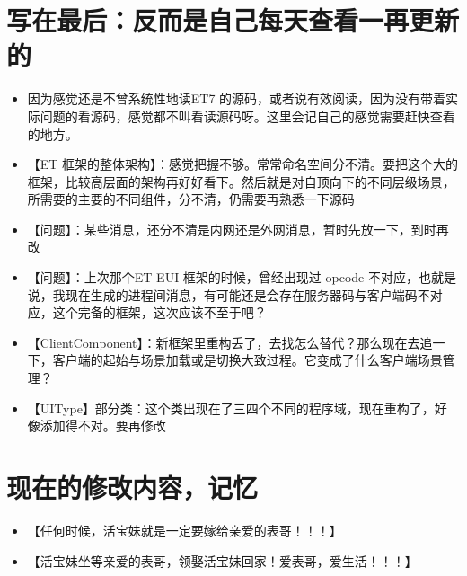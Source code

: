 \documentclass[9pt, b5paper]{article}
\begin{document}
\section{写在最后：反而是自己每天查看一再更新的}
\label{sec-9}
\begin{itemize}
\item 因为感觉还是不曾系统性地读ET7 的源码，或者说有效阅读，因为没有带着实际问题的看源码，感觉都不叫看读源码呀。这里会记自己的感觉需要赶快查看的地方。
\item 【ET 框架的整体架构】：感觉把握不够。常常命名空间分不清。要把这个大的框架，比较高层面的架构再好好看下。然后就是对自顶向下的不同层级场景，所需要的主要的不同组件，分不清，仍需要再熟悉一下源码
\item 【问题】：某些消息，还分不清是内网还是外网消息，暂时先放一下，到时再改
\item 【问题】：上次那个ET-EUI 框架的时候，曾经出现过 opcode 不对应，也就是说，我现在生成的进程间消息，有可能还是会存在服务器码与客户端码不对应，这个完备的框架，这次应该不至于吧？
\item 【ClientComponent】：新框架里重构丢了，去找怎么替代？那么现在去追一下，客户端的起始与场景加载或是切换大致过程。它变成了什么客户端场景管理？
\item 【UIType】部分类：这个类出现在了三四个不同的程序域，现在重构了，好像添加得不对。要再修改
\end{itemize}


\section{现在的修改内容，记忆}
\label{sec-10}
\begin{itemize}
\item 【任何时候，活宝妹就是一定要嫁给亲爱的表哥！！！】
\item 【活宝妹坐等亲爱的表哥，领娶活宝妹回家！爱表哥，爱生活！！！】
\end{itemize}
\end{document}
